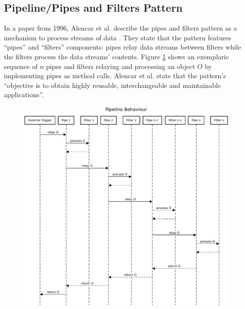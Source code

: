 \subsection{Pipeline/Pipes and Filters Pattern}
In a paper from 1996, Alencar et al. describe the pipes and filters pattern as a mechanism to process streams of data \cite{alencar_cowan_lucena_1996}. They state that the pattern features \enquote{pipes} and \enquote{filters} components: pipes relay data streams between filters while the filters process the data streams' contents. Figure \ref{fig:dp-pipes-filters} shows an exemplaric sequence of $n$ pipes and filters relaying and processing an object $O$ by implementing pipes as method calls. Alencar et al. state that the pattern's \enquote{objective is to obtain highly reusable, interchangeable and maintainable applications}.
\begin{figure}[h!]
    \centering
    \includegraphics[width=14cm]{img/ch03/pipeline-behaviour.pdf}
    \label{fig:dp-pipes-filters}
\end{figure}
